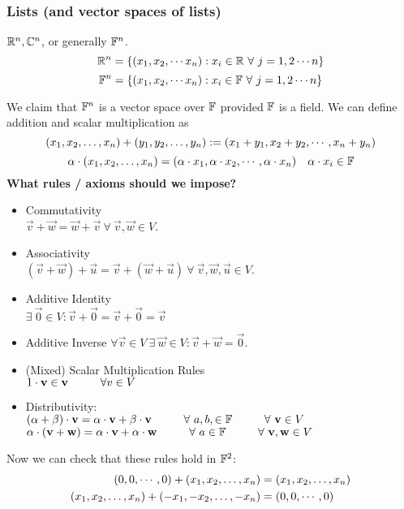\subsubsection{Lists (and vector spaces of lists)}
\begin{example} 
$\mathbb R^n, \mathbb C^n$, or generally $\mathbb F^n$. 
\[ \mathbb R^{n} = \left\{ (x_1,x_2, \cdots x_n) : x_i \in \mathbb R \ \forall \ j = 1,2 \cdots n \right\} \]
\[ \mathbb F^{n} = \left\{ (x_1,x_2, \cdots x_n) : x_i \in \mathbb F \ \forall \ j = 1,2 \cdots n \right\} \]
\end{example}
\noindent We claim that $\mathbb F^n$ is a vector space over $\mathbb F$ provided $\mathbb F$ is a field. We can define addition and scalar multiplication as 
\[ ({x}_1,{x}_2, \ldots, {x}_{n}) + ({y}_1,{y}_2, \ldots, {y}_{n}) := (x_1 + y_1, x_2 + y_2, \cdots , x_n + y_n)\]
\[ \alpha \cdot ({x}_1,{x}_2, \ldots, {x}_{n}) =  ( \alpha \cdot x_1, \alpha \cdot x_2, \cdots, \alpha \cdot x_n)\ \ \ \alpha \cdot x_i \in \mathbb F\]
\textbf{What rules / axioms should we impose?}
\begin{itemize}
    \item Commutativity \\
    $\vec v + \vec w = \vec w + \vec v \ \forall \ \vec v,\vec w \in V$. 
    \item Associativity \\
    $(\vec v + \vec w) + \vec u = \vec v + (\vec w + \vec u) \ \forall \ \vec v, \vec w, \vec u \in V$. 
    \item Additive Identity \\
    $\exists \ \vec 0 \in V : \vec v + \vec 0 = \vec v + \vec 0 = \vec v$ 
    \item Additive Inverse
    $\forall \vec v \in V \ \exists \ \vec w \in V : \vec v + \vec w = \vec 0$.
    \item (Mixed) Scalar Multiplication Rules \\
    $1 \cdot \mathbf v \in \mathbf v \hspace{1cm} \forall v \in V$
    \item Distributivity:  \\
    $(\alpha + \beta ) \cdot \vec v = \alpha \cdot \vec v + \beta \cdot \vec v \tab \forall \ a,b, \in \b F \tab \forall \ \vec v \in V$ \\
    $\alpha \cdot (\vec v + \vec w) = \alpha \cdot \vec v + \alpha \cdot \vec w \tab \forall \ a \in \b F \tab \forall \ \vec v ,\vec w \in V$
\end{itemize}
Now we can check that these rules hold in $\mathbb F^2$:
\begin{align*}
    (0,0,\cdots,0) + ({x}_1,{x}_2, \ldots, {x}_{n}) &= ({x}_1,{x}_2, \ldots, {x}_{n}) \\
    ({x}_1,{x}_2, \ldots, {x}_{n}) + ({-x}_1,{-x}_2, \ldots, {-x}_{n}) &= (0,0,\cdots,0) 
\end{align*} \\
